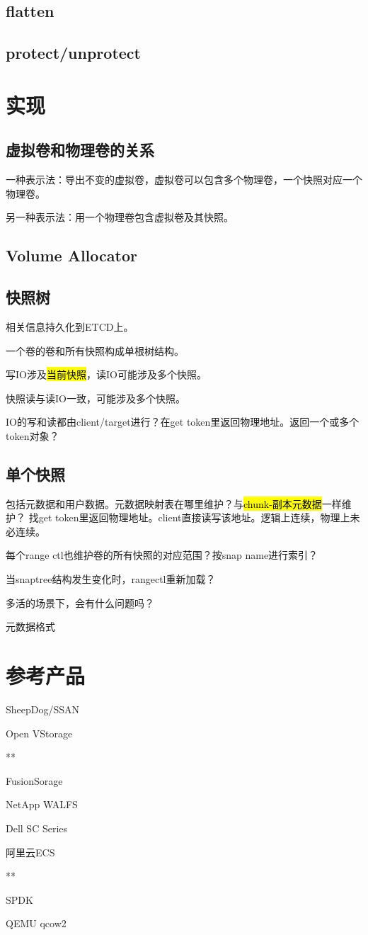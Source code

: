 \subsection{flatten}

\subsection{protect/unprotect}

\section{实现}

\subsection{虚拟卷和物理卷的关系}

一种表示法：导出不变的虚拟卷，虚拟卷可以包含多个物理卷，一个快照对应一个物理卷。

另一种表示法：用一个物理卷包含虚拟卷及其快照。

\subsection{Volume Allocator}

\subsection{快照树}

相关信息持久化到ETCD上。

一个卷的卷和所有快照构成单根树结构。

写IO涉及\hl{当前快照}，读IO可能涉及多个快照。

快照读与读IO一致，可能涉及多个快照。

IO的写和读都由client/target进行？在get token里返回物理地址。返回一个或多个token对象？

\subsection{单个快照}

包括元数据和用户数据。元数据映射表在哪里维护？与\hl{chunk-副本元数据}一样维护？
找get token里返回物理地址。client直接读写该地址。逻辑上连续，物理上未必连续。

每个range ctl也维护卷的所有快照的对应范围？按snap name进行索引？

当snaptree结构发生变化时，rangectl重新加载？

多活的场景下，会有什么问题吗？

元数据格式

\section{参考产品}

\begin{enumbox}
\item SheepDog/SSAN
\item Open VStorage
\item ***
\item FusionSorage
\item NetApp WALFS
\item Dell SC Series
\item 阿里云ECS
\item ***
\item SPDK
\item QEMU qcow2
\end{enumbox}
